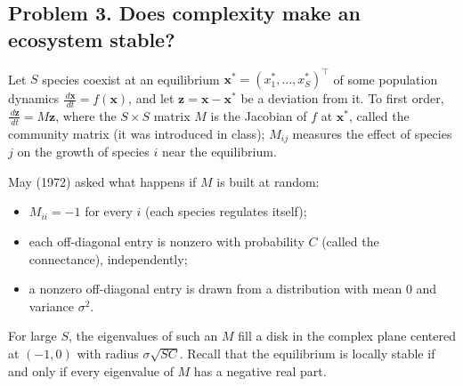 \documentclass[a4paper,12pt]{article}
\newcommand{\dd}{\,d}
\begin{document}
\subsection*{Problem 3. Does complexity make an ecosystem stable?}

Let $S$ species coexist at an equilibrium $\bm{x}^* = \left( x_1^*,\ldots,x_S^* \right)^{\top}$ of some population dynamics $\frac{\dd \bm{x}}{\dd t} = f(\bm{x})$, and let $\bm{z} = \bm{x}-\bm{x}^*$ be a deviation from it. To first order, $\frac{\dd \bm{z}}{\dd t} = M \bm{z}$, where the $S\times S$ matrix $M$ is the Jacobian of $f$ at $\bm{x}^*$, called the community matrix (it was introduced in class); $M_{ij}$ measures the effect of species $j$ on the growth of species $i$ near the equilibrium.

May (1972) asked what happens if $M$ is built at random:
\begin{itemize}
\item $M_{ii}=-1$ for every $i$ (each species regulates itself);
\item each off-diagonal entry is nonzero with probability $C$ (called the connectance), independently;
\item a nonzero off-diagonal entry is drawn from a distribution with mean $0$ and variance $\sigma^2$.
\end{itemize}
For large $S$, the eigenvalues of such an $M$ fill a disk in the complex plane centered at $(-1,0)$ with radius $\sigma\sqrt{SC}$. Recall that the equilibrium is locally stable if and only if every eigenvalue of $M$ has a negative real part.
\end{document}
